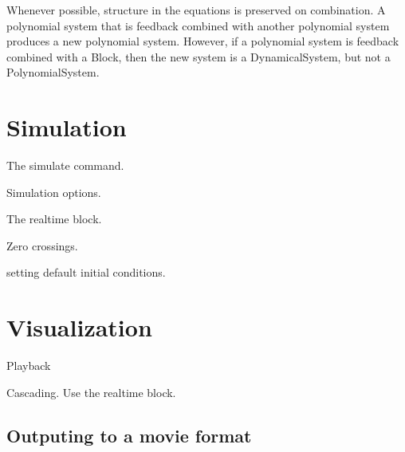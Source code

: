 Whenever possible, structure in the equations is preserved on
combination.  A polynomial system that is feedback combined with
another polynomial system produces a new polynomial system.   However,
if a polynomial system is feedback combined with a \simulink Block,
then the new system is a DynamicalSystem, but not a PolynomialSystem.  

\section{Simulation}

The simulate command.

Simulation options.  

The realtime block.

Zero crossings.

setting default initial conditions.

\section{Visualization}

Playback

Cascading.   Use the realtime block.

\subsection{Outputing to a movie format}
